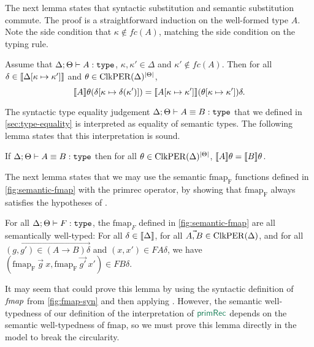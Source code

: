 The next lemma states that syntactic substitution and semantic
substitution commute. The proof is a straightforward induction on the
well-formed type $A$. Note the side condition that $\kappa \not\in
\mathit{fc}(A)$, matching the side condition on the
 typing rule.

\begin{lemma}\label{lem:substitution-lemma}
  Assume that $\Delta; \Theta \vdash A : \texttt{\textup{type}}$, $\kappa, \kappa'
  \in \Delta$ and $\kappa' \not\in \mathit{fc}(A)$. Then for all
  $\delta \in \llbracket \Delta[\kappa\mapsto\kappa'] \rrbracket$ and $\theta \in
  \mathrm{ClkPER}(\Delta)^{|\Theta|}$,
  \begin{displaymath}
    \llbracket A \rrbracket\theta (\delta[\kappa \mapsto \delta(\kappa')]) = \llbracket A[\kappa\mapsto\kappa'] \rrbracket(\theta[\kappa\mapsto\kappa'])\delta.
  \end{displaymath}
\end{lemma}

The syntactic type equality judgement $\Delta; \Theta \vdash A \equiv
B : \texttt{\textup{type}}$ that we defined in \autoref{sec:type-equality} is
interpreted as equality of semantic types. The following lemma states
that this interpretation is sound.

\begin{lemma}\label{lem:type-equality}
  If $\Delta; \Theta \vdash A \equiv B : \texttt{\textup{type}}$ then for all
  $\theta \in \mathrm{ClkPER}(\Delta)^{|\Theta|}$, $\llbracket A \rrbracket\theta =
  \llbracket B \rrbracket\theta$.
\end{lemma}

The next lemma states that we may use the semantic $\mathrm{fmap_F}$
functions defined in \autoref{fig:semantic-fmap} with the
$\mathrm{primrec}$ operator, by showing that $\mathrm{fmap_F}$ always
satisfies the hypotheses of .

\begin{lemma}\label{lem:sem-fmap-well-typed}
  For all $\Delta; \Theta \vdash F : \texttt{\textup{type}}$, the $\mathrm{fmap}_F$
  defined in \autoref{fig:semantic-fmap} are all semantically
  well-typed: For all $\delta \in \llbracket \Delta \rrbracket$, for all $\vec{A,B}
  \in \mathrm{ClkPER}(\Delta)$, and for all $\vec{(g,g') \in (A \to B)\delta}$
  and $(x,x') \in FA\delta$, we have $(\mathrm{fmap_F}\ \vec{g}\ x,
  \mathrm{fmap_F}\ \vec{g'}\ x') \in FB\delta$.
\end{lemma}

It may seem that could prove this lemma by using the syntactic
definition of $\textit{fmap}$ from \autoref{fig:fmap-syn} and then
applying . However, the semantic
well-typedness of our definition of the interpretation of
$\elim{primRec}$ depends on the semantic well-typedness of
$\mathrm{fmap}$, so we must prove this lemma directly in the model to
break the circularity.

